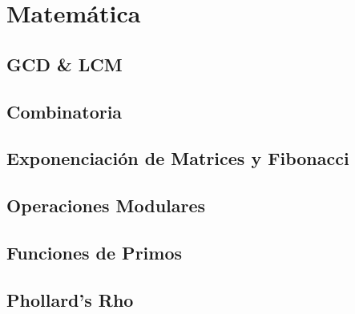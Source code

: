 \section{Matem\'atica}
\subsection{GCD \& LCM}

% 
% 
\subsection{Combinatoria}

\subsection{Exponenciaci\'on de Matrices y Fibonacci}

\subsection{Operaciones Modulares}

\subsection{Funciones de Primos}

\subsection{Phollard's Rho}

